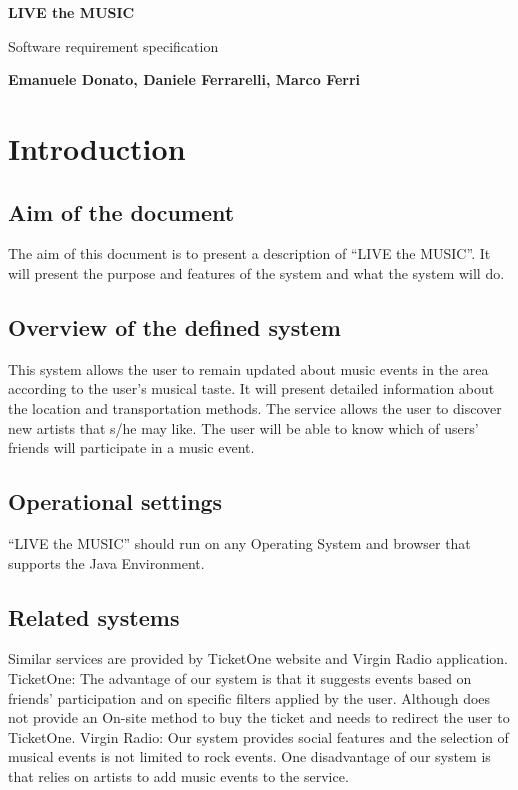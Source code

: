 \documentclass[11pt,a4paper]{article}
\begin{document}
\begin{titlepage}
   \begin{center}
       \vspace*{1cm}
 
       \textbf{LIVE the MUSIC}
 
       \vspace{0.5cm}
        Software requirement specification
 
       \vspace{5cm}
 
       \textbf{Emanuele Donato, Daniele Ferrarelli, Marco Ferri}
 
       \vfill
   \end{center}
\end{titlepage}
\section{Introduction}
\subsection{Aim of the document}
The aim of this document is to present a description of “LIVE the MUSIC”. It will present the purpose and features of the system and what the system will do.
\subsection{Overview of the defined system}
This system allows the user to remain updated about music events in the area according to the user’s musical taste. It will present detailed information about the location and transportation methods. The service allows the user to discover new artists that s/he may like. The user will be able to know which of users’ friends will participate in a music event.
\subsection{Operational settings}
“LIVE the MUSIC” should run on any Operating System and browser that supports the Java Environment. 
\subsection{Related systems}
Similar services are provided by TicketOne website and Virgin Radio application.
TicketOne: 
The advantage of our system is that it suggests events based on friends’ participation and on specific filters applied by the user. Although does not provide an On-site method to buy the ticket and needs to redirect the user to TicketOne. 
Virgin Radio:
Our system provides social features and the selection of musical events is not limited to rock events. One disadvantage of our system is that relies on artists to add music events to the service.
\end{document}

